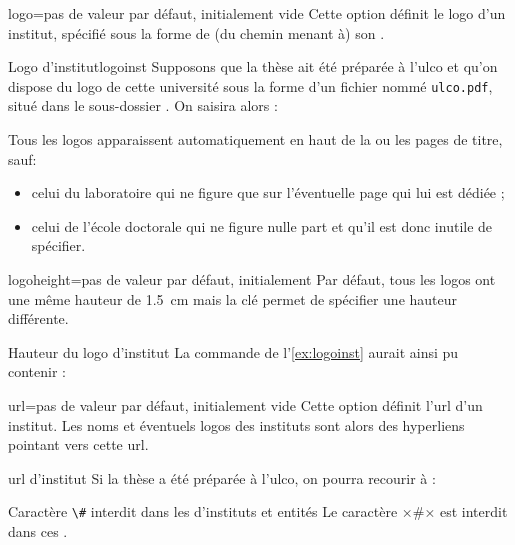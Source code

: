 \begin{docKey}{logo}{=}{pas de valeur
    par défaut, initialement vide}
  Cette option définit le logo d'un institut, spécifié sous la forme de (du
  chemin menant à) son .
  \begin{dbexample}{Logo d'institut}{logoinst}
    Supposons que la thèse ait été préparée à l'\gls{ulco} et qu'on dispose du
    logo de cette université sous la forme d'un fichier nommé
    \texttt{ulco.pdf}, situé dans le sous-dossier . On
    saisira alors :
\begin{bodycode}
\end{bodycode}
\end{dbexample}
Tous les logos apparaissent automatiquement en haut de la ou les
pages de titre, sauf:
\begin{itemize}
\item celui du laboratoire qui ne figure que sur l'éventuelle page qui lui est
  dédiée ;
\item celui de l'école doctorale qui ne figure nulle part et qu'il est donc
  inutile de spécifier.
\end{itemize}
\end{docKey}
%
\begin{docKey}{logoheight}{=}{pas de valeur par
    défaut, initialement \docValue*{1.5cm}}
  Par défaut, tous les logos ont une même hauteur de \SI{1.5}{\cm}
  mais la clé  permet de spécifier une hauteur
  différente.
  \begin{dbexample}{Hauteur du logo d'institut}{}
    La commande de l'\vref{ex:logoinst} aurait ainsi pu contenir :
\begin{bodycode}
\end{bodycode}
\end{dbexample}
\end{docKey}
%
%
\begin{docKey}{url}{=}{pas de valeur par
    défaut, initialement vide}
  Cette option définit l'\acrshort{url} d'un institut. Les noms et
  éventuels logos des instituts sont alors des hyperliens pointant
  vers cette \acrshort{url}.
  \begin{dbexample}{\acrshort*{url} d'institut}{}
    Si la thèse a été préparée à l'\gls{ulco}, on pourra recourir à
    : \NoAutoSpacing%
\begin{bodycode}
\end{bodycode}
\end{dbexample}
\begin{dbwarning}{Caractère \protect\lstinline+\#+ interdit dans les
     d'instituts et entités}{}
  Le caractère ×#× est interdit dans ces .
\end{dbwarning}
\end{docKey}

